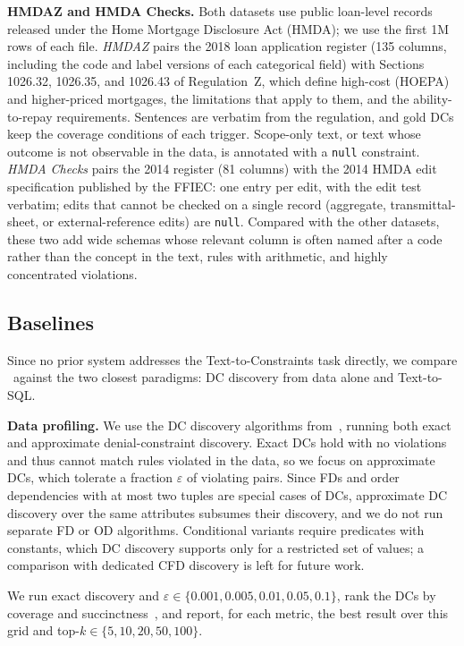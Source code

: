 \smallskip\noindent\textbf{HMDAZ and HMDA Checks.}
Both datasets use public loan-level records released under the Home Mortgage Disclosure Act (HMDA); we use the first 1M rows of each file. \emph{HMDAZ} pairs the 2018 loan application
register (135 columns, including the code and label versions of each
categorical field) with Sections 1026.32, 1026.35, and 1026.43 of Regulation~Z,
which define high-cost (HOEPA) and higher-priced mortgages, the limitations
that apply to them, and the ability-to-repay requirements. Sentences are verbatim from
the regulation, and gold DCs keep the coverage conditions of each trigger.
Scope-only text, or text whose outcome is not observable in the data, is
annotated with a \texttt{null} constraint. \emph{HMDA Checks} pairs the 2014
register (81 columns) with the 2014 HMDA edit specification published by the
FFIEC: one entry per edit, with the edit test verbatim; edits that cannot be
checked on a single record (aggregate, transmittal-sheet, or external-reference
edits) are \texttt{null}. Compared with the other datasets, these two add wide schemas whose relevant column is often named after a code rather than the concept in the text, rules with arithmetic, and highly concentrated violations.

\subsection{Baselines}
\label{sec:baselines}

Since no prior system addresses the Text-to-Constraints task directly, we compare \system\ against the two closest paradigms: DC discovery from data alone and Text-to-SQL.


\smallskip\noindent\textbf{Data profiling.}
We use the DC discovery algorithms from~\cite{Pena2022FastDC}, running both exact and approximate denial-constraint discovery. Exact DCs hold with no violations and thus cannot match rules violated in the data, so we focus on approximate DCs, which tolerate a fraction $\varepsilon$ of violating pairs. Since FDs and order dependencies with at most two tuples are special cases of DCs, approximate DC discovery over the same attributes subsumes their discovery, and we do not run separate FD or OD algorithms. Conditional variants require predicates with constants, which DC discovery supports only for a restricted set of values; a comparison with dedicated CFD discovery is left for future work.

We run exact discovery and $\varepsilon \in \{0.001, 0.005, 0.01, 0.05, 0.1\}$, rank the DCs by coverage and succinctness~\cite{chu2013discovering}, and report, for each metric, the best result over this grid and top-$k \in \{5, 10, 20, 50, 100\}$.

